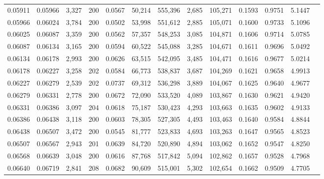 \begin{tabular}{rrrrrrrrrrrrr}
0.05911 & 0.05966 & 3,327 & 200 &                                     0.0567 &  50,214 & 555,396 &   2,685 & 105,271 & 0.1593 & 0.9751 & 5.1447 \\
0.05966 & 0.06024 & 3,784 & 200 &                                     0.0502 &  53,998 & 551,612 &   2,885 & 105,071 & 0.1600 & 0.9733 & 5.1096 \\
0.06025 & 0.06087 & 3,359 & 200 &                                     0.0562 &  57,357 & 548,253 &   3,085 & 104,871 & 0.1606 & 0.9714 & 5.0785 \\
0.06087 & 0.06134 & 3,165 & 200 &                                     0.0594 &  60,522 & 545,088 &   3,285 & 104,671 & 0.1611 & 0.9696 & 5.0492 \\
0.06134 & 0.06178 & 2,993 & 200 &                                     0.0626 &  63,515 & 542,095 &   3,485 & 104,471 & 0.1616 & 0.9677 & 5.0214 \\
0.06178 & 0.06227 & 3,258 & 202 &                                     0.0584 &  66,773 & 538,837 &   3,687 & 104,269 & 0.1621 & 0.9658 & 4.9913 \\
0.06227 & 0.06279 & 2,539 & 202 &                                     0.0737 &  69,312 & 536,298 &   3,889 & 104,067 & 0.1625 & 0.9640 & 4.9677 \\
0.06279 & 0.06331 & 2,778 & 200 &                                     0.0672 &  72,090 & 533,520 &   4,089 & 103,867 & 0.1630 & 0.9621 & 4.9420 \\
0.06331 & 0.06386 & 3,097 & 204 &                                     0.0618 &  75,187 & 530,423 &   4,293 & 103,663 & 0.1635 & 0.9602 & 4.9133 \\
0.06386 & 0.06438 & 3,118 & 200 &                                     0.0603 &  78,305 & 527,305 &   4,493 & 103,463 & 0.1640 & 0.9584 & 4.8844 \\
0.06438 & 0.06507 & 3,472 & 200 &                                     0.0545 &  81,777 & 523,833 &   4,693 & 103,263 & 0.1647 & 0.9565 & 4.8523 \\
0.06507 & 0.06567 & 2,943 & 201 &                                     0.0639 &  84,720 & 520,890 &   4,894 & 103,062 & 0.1652 & 0.9547 & 4.8250 \\
0.06568 & 0.06639 & 3,048 & 200 &                                     0.0616 &  87,768 & 517,842 &   5,094 & 102,862 & 0.1657 & 0.9528 & 4.7968 \\
0.06640 & 0.06719 & 2,841 & 208 &                                     0.0682 &  90,609 & 515,001 &   5,302 & 102,654 & 0.1662 & 0.9509 & 4.7705 \\

\end{tabular}
